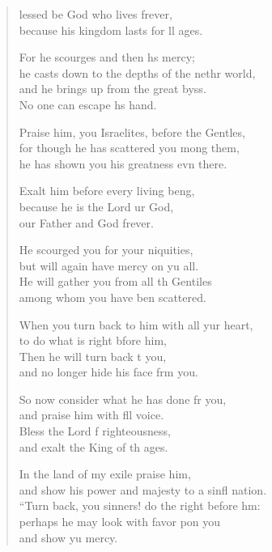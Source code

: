 \begin{verse}
  \begin{patverse}
    lessed be God who lives frever,\Med\\
    because his kingdom lasts for ll ages.

    For he scourges and then hs mercy;\Med\\
    he casts down to the depths of the nethr world,\\
    and he brings up from the great byss.\Med\\
    No one can escape h\pointup{\i}s hand.

    Praise him, you Israelites, before the Gent\pointup{\i}les,\Flex\\
    for though he has scattered you mong them,\Med\\
    he has shown you his greatness evn there.

    Exalt him before every living be\pointup{\i}ng,\Flex\\
    because he is the Lord ur God,\Med\\
    our Father and God frever.

    He scourged you for your \pointup{\i}niquities,\Med\\
    but will again have mercy on yu all.\\
    He will gather you from all th Gentiles\Med\\
    among whom you have ben scattered.

    When you turn back to him with all yur heart,\Med\\
    to do what is right bfore him,\\
    Then he will turn back t you,\Med\\
    and no longer hide his face frm you.

    So now consider what he has done fr you,\Med\\
    and praise him with fll voice.\\
    Bless the Lord f righteousness,\Med\\
    and exalt the King of th ages.

    In the land of my exile  praise him,\Med\\
    and show his power and majesty to a sinfl nation.\\
    “Turn back, you sinners! do the right before h\pointup{\i}m:\Flex\\
    perhaps he may look with favor pon you\Med\\
    and show yu mercy.


\end{patverse}
\end{verse}
